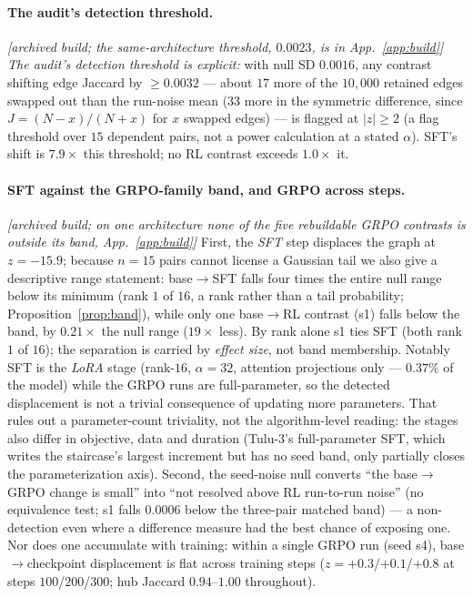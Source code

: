 \documentclass{article}
\begin{document}
\paragraph{The audit's detection threshold.} \emph{[archived build; the same-architecture threshold, $0.0023$, is in App.~\ref{app:build}]} \emph{The audit's detection threshold is explicit:} with null SD $0.0016$, any contrast shifting edge Jaccard by $\ge0.0032$ --- about $17$ more of the $10{,}000$ retained edges swapped out than the run-noise mean ($33$ more in the symmetric difference, since \mbox{$J=(N-x)/(N+x)$} for $x$ swapped edges) --- is flagged at $|z|\ge2$ (a flag threshold over $15$ dependent pairs, not a power calculation at a stated $\alpha$). SFT's shift is $7.9\times$ this threshold; no RL contrast exceeds $1.0\times$ it.

\paragraph{SFT against the GRPO-family band, and GRPO across steps.} \emph{[archived build; on one architecture none of the five rebuildable GRPO contrasts is outside its band, App.~\ref{app:build}]} First, the \emph{SFT} step displaces the graph at $z=-15.9$; because $n{=}15$ pairs cannot license a Gaussian tail we also give a descriptive range statement: base$\to$SFT falls four times the entire null range below its minimum (rank $1$ of $16$, a rank rather than a tail probability; Proposition~\ref{prop:band}), while only one base$\to$RL contrast (s1) falls below the band, by $0.21\times$ the null range ($19\times$ less). By rank alone s1 ties SFT (both rank $1$ of $16$); the separation is carried by \emph{effect size}, not band membership. Notably SFT is the \emph{LoRA} stage (rank-$16$, $\alpha{=}32$, attention projections only --- $0.37\%$ of the model) while the GRPO runs are full-parameter, so the detected displacement is not a trivial consequence of updating more parameters. That rules out a parameter-count triviality, not the algorithm-level reading: the stages also differ in objective, data and duration (Tulu-3's full-parameter SFT, which writes the staircase's largest increment but has no seed band, only partially closes the parameterization axis). Second, the seed-noise null converts ``the base$\to$GRPO change is small'' into ``not resolved above RL run-to-run noise'' (no equivalence test; s1 falls $0.0006$ below the three-pair matched band) --- a non-detection even where a difference measure had the best chance of exposing one. Nor does one accumulate with training: within a single GRPO run (seed s4), base$\to$checkpoint displacement is flat across training steps ($z=+0.3$/$+0.1$/$+0.8$ at steps $100$/$200$/$300$; hub Jaccard $0.94$--$1.00$ throughout).
\end{document}
